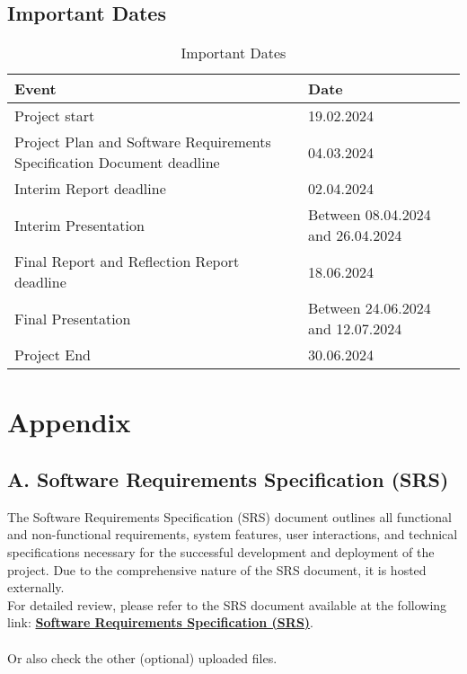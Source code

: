\documentclass[12pt,a4paper]{article}
\begin{document}
\subsection{Important Dates}

\begin{table}[h!]
\centering
\begin{adjustbox}{scale=1,center}
\begin{tabular}{|p{8cm}|p{7cm}|} %
\hline
\textbf{Event} & \textbf{Date} \\
\hline
Project start & 19.02.2024 \\ \hline
Project Plan and Software Requirements Specification Document deadline & 04.03.2024 \\ \hline
Interim Report deadline & 02.04.2024 \\ \hline
Interim Presentation & Between 08.04.2024 and 26.04.2024 \\ \hline
Final Report and Reflection Report deadline & 18.06.2024 \\ \hline
Final Presentation & Between 24.06.2024 and 12.07.2024 \\ \hline
Project End & 30.06.2024 \\
\hline
\end{tabular}
\end{adjustbox}
\caption{Important Dates}
\end{table}
\vspace{\baselineskip} %


\newpage
\appendix
\section*{Appendix}
\subsection*{A. Software Requirements Specification (SRS)}
The Software Requirements Specification (SRS) document outlines all functional and non-functional requirements, system features, user interactions, and technical specifications necessary for the successful development and deployment of the project. Due to the comprehensive nature of the SRS document, it is hosted externally. \\ For detailed review, please refer to the SRS document available at the following link: \href{https://github.com/Warglaive/Fontys_deliverables_spienzer/blob/main/Project_plan/Appendix_A_SRS.pdf}{\textbf{Software Requirements Specification (SRS)}}. \\ \\ Or also check the other (optional) uploaded files.
\end{document}
